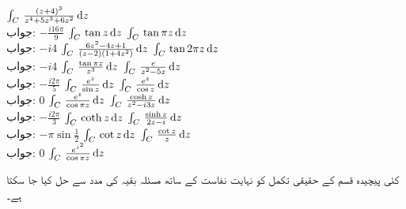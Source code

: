 \quad
$\int_C \,\tfrac{(z+4)^3}{z^4+5z^3+6z^2}\dif z$\\
جواب:\quad
$-\tfrac{i16\pi}{9}$
\quad
$\int_C \,\tan z\dif z$
\quad
$\int_C \,\tan \pi z\dif z$\\
جواب:\quad
$-i4$
\quad
$\int_C \,\tfrac{6z^2-4z+1}{(z-2)(1+4z^2)}\dif z$
\quad
$\int_C \,\tan 2\pi z\dif z$\\
جواب:\quad
$-i4$
\quad
$\int_C \,\tfrac{\tan \pi z}{z^3}\dif z$
\quad
$\int_C \,\tfrac{e}{z^2-5z}\dif z$\\
جواب:\quad
$-\tfrac{i2\pi}{5}$
\quad
$\int_C \,\tfrac{e^z}{\sin z}\dif z$
\quad
$\int_C \,\tfrac{e^z}{\cos z}\dif z$\\
جواب:\quad
$0$
\quad
$\int_C \,\tfrac{e^z}{\cos \pi z}\dif z$
\quad
$\int_C \,\tfrac{\cosh z}{z^2-i3z}\dif z$\\
جواب:\quad
$-\tfrac{i2\pi}{3}$
\quad
$\int_C \,\coth z\dif z$
\quad
$\int_C \,\tfrac{\sinh z}{2z-i}\dif z$\\
جواب:\quad
$-\pi\sin \tfrac{1}{2}$
\quad
$\int_C \,\cot z\dif z$
\quad
$\int_C \,\tfrac{\cot z}{z}\dif z$\\
جواب:\quad
$0$
\quad
$\int_C \,\tfrac{e^{z^2}}{\cos \pi z}\dif z$

کئی پیچیدہ قسم کے حقیقی تکمل کو نہایت نفاست کے ساتھ مسئلہ بقیہ کی  مدد سے حل کیا جا سکتا ہے۔

